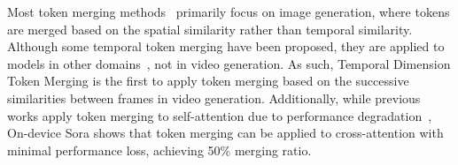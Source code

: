 
Most token merging methods~\cite{bolya2022token,bolya2023token,feng2023efficient} primarily focus on image generation, where tokens are merged based on the spatial similarity rather than temporal similarity. Although some temporal token merging have been proposed, they are applied to models in other domains~\cite{gotz2024efficient,li2024vidtome, chen2024tempme}, not in video generation. As such, Temporal Dimension Token Merging is the first to apply token merging based on the successive similarities between frames in video generation. Additionally, while previous works apply token merging to self-attention due to performance degradation~\cite{bolya2022token,bolya2023token,feng2023efficient,li2024vidtome}, On-device Sora shows that token merging can be applied to cross-attention with minimal performance loss, achieving 50\% merging ratio.
